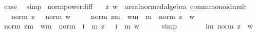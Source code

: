 \begin{isabellebody}
\ {\isacharquery}{\kern0pt}case\ \isamarkupfalse%
\ simp\isanewline
{}\isamarkupfalse%
%
\endisatagproof
{\isafoldproof}%
%
\isadelimproof
\isanewline
%
\endisadelimproof
\isanewline
{}\isamarkupfalse%
\ norm{\isacharunderscore}{\kern0pt}power{\isacharunderscore}{\kern0pt}diff{\isacharcolon}{\kern0pt}\isanewline
\ \ \ z\ w\ {\isacharcolon}{\kern0pt}{\isacharcolon}{\kern0pt}\ {\isachardoublequoteopen}{\isacharprime}{\kern0pt}a{\isacharcolon}{\kern0pt}{\isacharcolon}{\kern0pt}{\isacharbraceleft}{\kern0pt}real{\isacharunderscore}{\kern0pt}normed{\isacharunderscore}{\kern0pt}algebra{\isacharunderscore}{\kern0pt}{}{\isacharcomma}{\kern0pt}\ comm{\isacharunderscore}{\kern0pt}monoid{\isacharunderscore}{\kern0pt}mult{\isacharbraceright}{\kern0pt}{\isachardoublequoteclose}\isanewline
\ \ \ {\isachardoublequoteopen}norm\ z\ {\isasymle}\ {}{\isachardoublequoteclose}\ {\isachardoublequoteopen}norm\ w\ {\isasymle}\ {}{\isachardoublequoteclose}\isanewline
\ \ \ {\isachardoublequoteopen}norm\ {\isacharparenleft}{\kern0pt}z{\isacharcircum}{\kern0pt}m\ {\isacharminus}{\kern0pt}\ w{\isacharcircum}{\kern0pt}m{\isacharparenright}{\kern0pt}\ {\isasymle}\ m\ {\isacharasterisk}{\kern0pt}\ norm\ {\isacharparenleft}{\kern0pt}z\ {\isacharminus}{\kern0pt}\ w{\isacharparenright}{\kern0pt}{\isachardoublequoteclose}\isanewline
%
\isadelimproof
%
\endisadelimproof
%
\isatagproof
{}\isamarkupfalse%
\ {\isacharminus}{\kern0pt}\isanewline
\ \ \isamarkupfalse%
\ {\isachardoublequoteopen}norm\ {\isacharparenleft}{\kern0pt}z{\isacharcircum}{\kern0pt}m\ {\isacharminus}{\kern0pt}\ w{\isacharcircum}{\kern0pt}m{\isacharparenright}{\kern0pt}\ {\isacharequal}{\kern0pt}\ norm\ {\isacharparenleft}{\kern0pt}{\isacharparenleft}{\kern0pt}{\isasymProd}\ i\ {\isacharless}{\kern0pt}\ m{\isachardot}{\kern0pt}\ z{\isacharparenright}{\kern0pt}\ {\isacharminus}{\kern0pt}\ {\isacharparenleft}{\kern0pt}{\isasymProd}\ i\ {\isacharless}{\kern0pt}\ m{\isachardot}{\kern0pt}\ w{\isacharparenright}{\kern0pt}{\isacharparenright}{\kern0pt}{\isachardoublequoteclose}\isanewline
\ \ \ \ \isamarkupfalse%
\ simp\isanewline
\ \ \isamarkupfalse%
\ \isamarkupfalse%
\ {\isachardoublequoteopen}{\isasymdots}\ {\isasymle}\ {\isacharparenleft}{\kern0pt}{\isasymSum}i{\isacharless}{\kern0pt}m{\isachardot}{\kern0pt}\ norm\ {\isacharparenleft}{\kern0pt}z\ {\isacharminus}{\kern0pt}\ w{\isacharparenright}{\kern0pt}{\isacharparenright}{\kern0pt}{\isachardoublequoteclose}\isanewline

\end{isabellebody}
